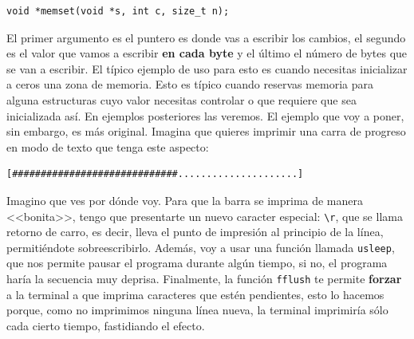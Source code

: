 \documentclass[a4paper]{article}
\begin{document}
\noindent
\begin{minipage}[H]{\linewidth}
\mbox{}
\begin{lstlisting}[style=C,
caption={Declaración de la función \texttt{memset}},
label={lst:memsetSignature}]
void *memset(void *s, int c, size_t n);
\end{lstlisting}
\end{minipage}
El primer argumento es el puntero es donde vas a escribir los cambios, el
segundo es el valor que vamos a escribir \textbf{en cada byte} y el último
el número de bytes que se van a escribir. El típico ejemplo de uso para esto
es cuando necesitas inicializar a ceros una zona de memoria. Esto es típico
cuando reservas memoria para alguna estructuras cuyo valor necesitas controlar
o que requiere que sea inicializada así. En ejemplos posteriores las veremos.
El ejemplo que voy a poner, sin embargo, es más original. Imagina que
quieres imprimir una carra de progreso en modo de texto que tenga este aspecto:
\begin{verbatim}
[#############################.....................]
\end{verbatim}
Imagino que ves por dónde voy. Para que la barra se imprima de manera
<<bonita>>, tengo que presentarte un  nuevo caracter especial: \verb!\r!, que
se llama retorno de carro, es decir, lleva el punto de impresión al principio
de la línea, permitiéndote sobreescribirlo. Además, voy a usar una función
llamada \verb!usleep!, que nos permite pausar el programa durante algún tiempo,
si no, el programa haría la secuencia muy deprisa. Finalmente, la función
\verb!fflush! te permite \textbf{forzar} a la terminal a que imprima caracteres
que estén pendientes, esto lo hacemos porque, como no imprimimos ninguna línea
nueva, la terminal imprimiría sólo cada cierto tiempo, fastidiando el efecto.
\end{document}
